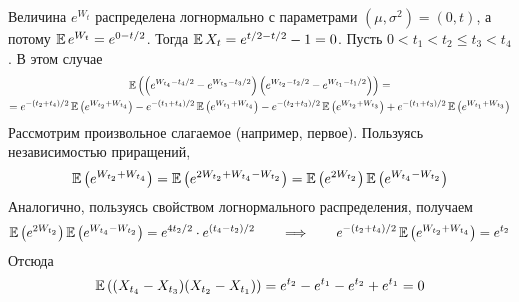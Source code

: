 \begin{solution}
    Величина $ e^{W_t} $ распределена логнормально с параметрами $ (\mu, \sigma^2) = (0, t) $, а потому $ \operatorname{\mathbb{E}} e^{W_t} = e^{0-t/2} $.
    Тогда $ \operatorname{\mathbb{E}} X_t = e^{t/2 - t/2} - 1 = 0 $.
    Пусть $ 0 < t_1 < t_2 \leqslant t_3 < t_4 $.
    В этом случае
    \begin{multline*}
        \operatorname{\mathbb{E}} \left( \left( e^{W_{t_4} - t_4/2} - e^{W_{t_3} - t_3/2} \right) \left( e^{W_{t_2} - t_2/2} - e^{W_{t_1} - t_1/2} \right) \right) = \\
        = e^{-(t_2 + t_4)/2} \operatorname{\mathbb{E}} \left( e^{W_{t_2} + W_{t_4}} \right) - e^{-(t_1 + t_4)/2} \operatorname{\mathbb{E}} \left( e^{W_{t_1} + W_{t_4}} \right)
        - e^{-(t_2 + t_3)/2} \operatorname{\mathbb{E}} \left( e^{W_{t_2} + W_{t_3}} \right) + e^{-(t_1 + t_3)/2} \operatorname{\mathbb{E}} \left( e^{W_{t_1} + W_{t_3}} \right)
    \end{multline*}
    Рассмотрим произвольное слагаемое (например, первое).
    Пользуясь независимостью приращений,
    \[
        \operatorname{\mathbb{E}} \left( e^{W_{t_2} + W_{t_4}} \right) = \operatorname{\mathbb{E}} \left( e^{2 W_{t_2} + W_{t_4} - W_{t_2}} \right) = \operatorname{\mathbb{E}} \left( e^{2 W_{t_2}} \right) \operatorname{\mathbb{E}} \left( e^{W_{t_4} - W_{t_2}} \right)
    \]
    Аналогично, пользуясь свойством логнормального распределения, получаем
    \[
        \operatorname{\mathbb{E}} \left( e^{2 W_{t_2}} \right) \operatorname{\mathbb{E}} \left( e^{W_{t_4} - W_{t_2}} \right) = e^{4 t_2 / 2} \cdot e^{(t_4 - t_2) / 2}
        \qquad \Longrightarrow \qquad
        e^{-(t_2 + t_4)/2} \operatorname{\mathbb{E}} \left( e^{W_{t_2} + W_{t_4}} \right) = e^{t_2}
    \]
    Отсюда
    \[
        \operatorname{\mathbb{E}} \left( (X_{t_4} - X_{t_3})(X_{t_2} - X_{t_1}) \right) = e^{t_2} - e^{t_1} - e^{t_2} + e^{t_1} = 0
    \]
\end{solution}
